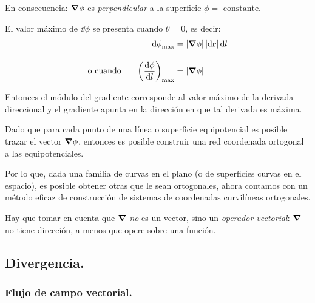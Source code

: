 \documentclass[12pt]{article}
\numberwithin{equation}{section}
\begin{document}
En consecuencia: $\grad{\phi}$ es \emph{perpendicular} a la superficie $\phi = \mbox{ constante}$.
\par
El valor máximo de $\dd{\phi}$ se presenta cuando $\theta = 0$, es decir:
\begin{align*}
\dd{\phi}_{\max} &= \abs{\grad{\phi}} \, \abs{\dd{\vb{r}}} \dd{l} \\[1em]
\mbox{o cuando } \hspace{0.5cm} \left( \dv{\phi}{l} \right)_{\max} &= \abs{\grad{\phi}}
\end{align*}

Entonces el módulo del gradiente corresponde al valor máximo de la derivada direccional y el gradiente apunta en la dirección en que tal derivada es máxima.
\par
Dado que para cada punto de una línea o superficie equipotencial es posible trazar el vector $\grad{\phi}$, entonces es posible construir una red coordenada ortogonal a las equipotenciales.
\par
Por lo que, dada una familia de curvas en el plano (o de superficies curvas en el espacio), es posible obtener otras que le sean ortogonales, ahora contamos con un método eficaz de construcción de sistemas de coordenadas curvilíneas ortogonales.
\par
Hay que tomar en cuenta que $\grad$ \emph{no} es un vector, sino un \emph{operador vectorial}: $\grad$ no tiene dirección, a menos que opere sobre una función.

\subsection{Divergencia.}

\subsubsection{Flujo de campo vectorial.}
\end{document}
